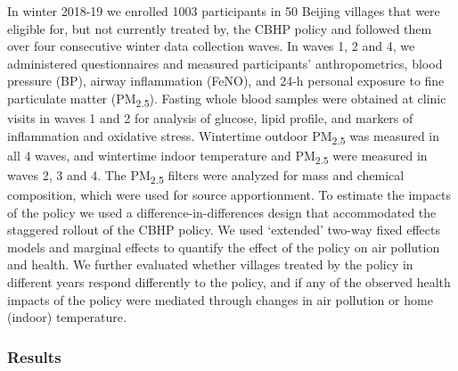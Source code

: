 \documentclass[
  letterpaper,
  DIV=11,
  numbers=noendperiod]{scrartcl}
\begin{document}
In winter 2018-19 we enrolled 1003 participants in 50 Beijing villages
that were eligible for, but not currently treated by, the CBHP policy
and followed them over four consecutive winter data collection waves. In
waves 1, 2 and 4, we administered questionnaires and measured
participants' anthropometrics, blood pressure (BP), airway inflammation
(FeNO), and 24-h personal exposure to fine particulate matter
(PM\textsubscript{2.5}). Fasting whole blood samples were obtained at
clinic visits in waves 1 and 2 for analysis of glucose, lipid profile,
and markers of inflammation and oxidative stress. Wintertime outdoor
PM\textsubscript{2.5} was measured in all 4 waves, and wintertime indoor
temperature and PM\textsubscript{2.5} were measured in waves 2, 3 and 4.
The PM\textsubscript{2.5} filters were analyzed for mass and chemical
composition, which were used for source apportionment. To estimate the
impacts of the policy we used a difference-in-differences design that
accommodated the staggered rollout of the CBHP policy. We used
`extended' two-way fixed effects models and marginal effects to quantify
the effect of the policy on air pollution and health. We further
evaluated whether villages treated by the policy in different years
respond differently to the policy, and if any of the observed health
impacts of the policy were mediated through changes in air pollution or
home (indoor) temperature.

\hypertarget{results}{%
\subsubsection*{Results}\label{results}}
\end{document}
